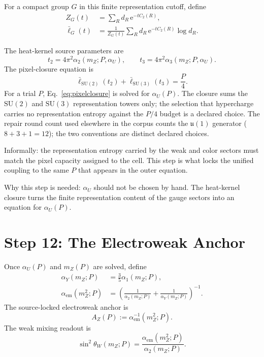 \documentclass[11pt]{article}
\theoremstyle{remark}
\newcommand{\SU}{\mathrm{SU}}
\newcommand{\e}{\mathrm e}
\newcommand{\AZ}{A_Z}
\begin{document}
For a compact group \(G\) in this finite representation cutoff, define
\begin{align}
Z_G(t)&=\sum_R d_R\,\e^{-tC_2(R)},\\
\bar\ell_G(t)&=
\frac{1}{Z_G(t)}
\sum_R d_R\,\e^{-tC_2(R)}\log d_R.
\label{eq:ellbar}
\end{align}

The heat-kernel source parameters are
\begin{equation}
t_2=4\pi^2\alpha_2(m_Z;P,\alpha_U),
\qquad
t_3=4\pi^2\alpha_3(m_Z;P,\alpha_U).
\label{eq:t23}
\end{equation}
The pixel-closure equation is
\begin{equation}
\boxed{
\bar\ell_{\SU(2)}(t_2)+\bar\ell_{\SU(3)}(t_3)=\frac{P}{4}.
}
\label{eq:pixelclosure}
\end{equation}
For a trial \(P\), Eq.~\eqref{eq:pixelclosure} is solved for \(\alpha_U(P)\).
The closure sums the \(\SU(2)\) and \(\SU(3)\) representation towers only; the
selection that hypercharge carries no representation entropy against the
\(P/4\) budget is a declared choice. The repair round count used elsewhere in
the corpus counts the \(\mathfrak u(1)\) generator (\(8+3+1=12\)); the two
conventions are distinct declared choices.

Informally: the representation entropy carried by the weak and color sectors must match the pixel capacity assigned to the cell. This step is what locks the unified coupling to the same \(P\) that appears in the outer equation.

Why this step is needed: \(\alpha_U\) should not be chosen by hand. The heat-kernel closure turns the finite representation content of the gauge sectors into an equation for \(\alpha_U(P)\).

\section{Step 12: The Electroweak Anchor}

Once \(\alpha_U(P)\) and \(m_Z(P)\) are solved, define
\begin{align}
\alpha_Y(m_Z;P)&=\frac{3}{5}\alpha_1(m_Z;P),\\
\alpha_{\mathrm{em}}(m_Z^2;P)
&=
\left(
\frac{1}{\alpha_2(m_Z;P)}
+\frac{1}{\alpha_Y(m_Z;P)}
\right)^{-1}.
\label{eq:alphaem}
\end{align}
The source-locked electroweak anchor is
\begin{equation}
\boxed{
\AZ(P):=\alpha_{\mathrm{em}}^{-1}(m_Z^2;P).
}
\label{eq:AZ}
\end{equation}
The weak mixing readout is
\begin{equation}
\sin^2\theta_W(m_Z;P)=
\frac{\alpha_{\mathrm{em}}(m_Z^2;P)}{\alpha_2(m_Z;P)}.
\label{eq:sin2}
\end{equation}
\end{document}

